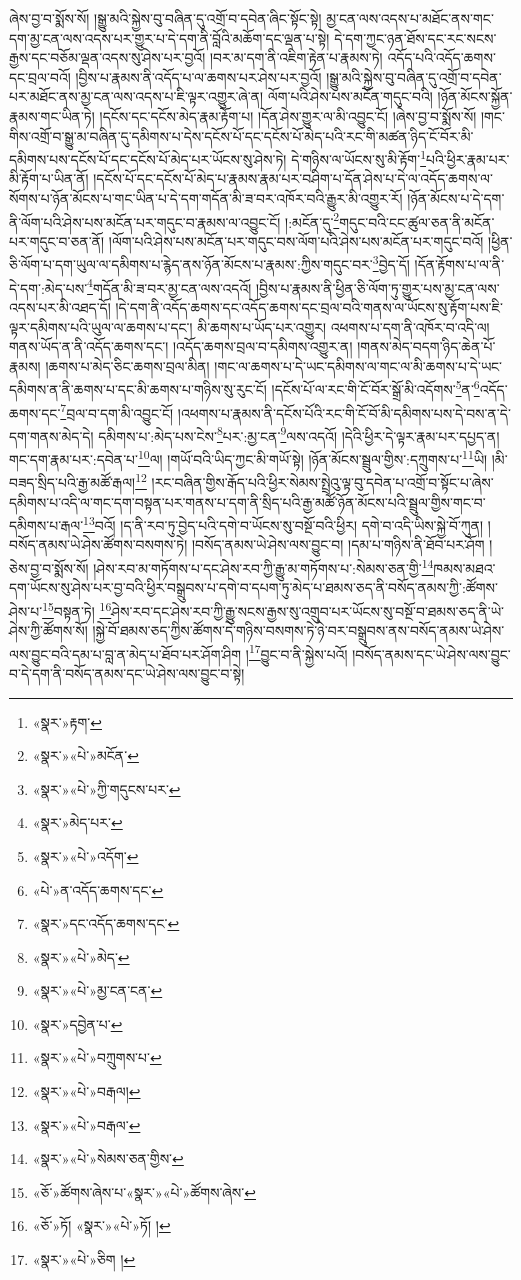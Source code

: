 ཞེས་བྱ་བ་སྨོས་སོ། །སྒྱུ་མའི་སྐྱེས་བུ་བཞིན་དུ་འགྲོ་བ་དབེན་ཞིང་སྟོང་སྟེ། མྱ་ངན་ལས་འདས་པ་མཐོང་ནས་གང་དག་མྱ་ངན་ལས་འདས་པར་གྱུར་པ་དེ་དག་ནི་བློའི་མཆོག་དང་ལྡན་པ་སྟེ། དེ་དག་ཀྱང་ཉན་ཐོས་དང་རང་སངས་རྒྱས་དང་བཅོམ་ལྡན་འདས་སུ་ཤེས་པར་བྱའོ། །བར་མ་དག་ནི་འཇིག་རྟེན་པ་རྣམས་ཏེ། འདོད་པའི་འདོད་ཆགས་དང་བྲལ་བའོ། །བྱིས་པ་རྣམས་ནི་འདོད་པ་ལ་ཆགས་པར་ཤེས་པར་བྱའོ། །སྒྱུ་མའི་སྐྱེས་བུ་བཞིན་དུ་འགྲོ་བ་དབེན་པར་མཐོང་ནས་མྱ་ངན་ལས་འདས་པ་ཇི་ལྟར་འགྱུར་ཞེ་ན། ལོག་པའི་ཤེས་པས་མངོན་གདུང་བའི། །ཉོན་མོངས་སྐྱོན་རྣམས་གང་ཡིན་ཏེ། །དངོས་དང་དངོས་མེད་རྣམ་རྟོག་པ། །དོན་ཤེས་གྱུར་ལ་མི་འབྱུང་ངོ། །ཞེས་བྱ་བ་སྨོས་སོ། །གང་གིས་འགྲོ་བ་སྒྱུ་མ་བཞིན་དུ་དམིགས་པ་དེས་དངོས་པོ་དང་དངོས་པོ་མེད་པའི་རང་གི་མཚན་ཉིད་ངོ་བོར་མི་དམིགས་པས་དངོས་པོ་དང་དངོས་པོ་མེད་པར་ཡོངས་སུ་ཤེས་ཏེ། དེ་གཉིས་ལ་ཡོངས་སུ་མི་རྟོག་\footnote{«སྣར་»རྟག་}པའི་ཕྱིར་རྣམ་པར་མི་རྟོག་པ་ཡིན་ནོ། །དངོས་པོ་དང་དངོས་པོ་མེད་པ་རྣམས་རྣམ་པར་བཤིག་པ་དོན་ཤེས་པ་དེ་ལ་འདོད་ཆགས་ལ་སོགས་པ་ཉོན་མོངས་པ་གང་ཡིན་པ་དེ་དག་གདོན་མི་ཟ་བར་འཁོར་བའི་རྒྱུར་མི་འགྱུར་རོ། །ཉོན་མོངས་པ་དེ་དག་ནི་ལོག་པའི་ཤེས་པས་མངོན་པར་གདུང་བ་རྣམས་ལ་འབྱུང་ངོ། །:མངོན་དུ་\footnote{«སྣར་»«པེ་»མངོན་}གདུང་བའི་ངང་ཚུལ་ཅན་ནི་མངོན་པར་གདུང་བ་ཅན་ནོ། །ལོག་པའི་ཤེས་པས་མངོན་པར་གདུང་བས་ལོག་པའི་ཤེས་པས་མངོན་པར་གདུང་བའོ། །ཕྱིན་ཅི་ལོག་པ་དག་ཡུལ་ལ་དམིགས་པ་རྙེད་ནས་ཉོན་མོངས་པ་རྣམས་:ཀྱིས་གདུང་བར་\footnote{«སྣར་»«པེ་»ཀྱི་གདུངས་པར་}བྱེད་དོ། །དོན་རྟོགས་པ་ལ་ནི་དེ་དག་:མེད་པས་\footnote{«སྣར་»མེད་པར་}གདོན་མི་ཟ་བར་མྱ་ངན་ལས་འདའོ། །བྱིས་པ་རྣམས་ནི་ཕྱིན་ཅི་ལོག་ཏུ་གྱུར་པས་མྱ་ངན་ལས་འདས་པར་མི་འཐད་དོ། །དེ་དག་ནི་འདོད་ཆགས་དང་འདོད་ཆགས་དང་བྲལ་བའི་གནས་ལ་ཡོངས་སུ་རྟོག་པས་ཇི་ལྟར་དམིགས་པའི་ཡུལ་ལ་ཆགས་པ་དང་། མི་ཆགས་པ་ཡོད་པར་འགྱུར། འཕགས་པ་དག་ནི་འཁོར་བ་འདི་ལ། གནས་ཡོད་ན་ནི་འདོད་ཆགས་དང་། །འདོད་ཆགས་བྲལ་བ་དམིགས་འགྱུར་ན། །གནས་མེད་བདག་ཉིད་ཆེན་པོ་རྣམས། །ཆགས་པ་མེད་ཅིང་ཆགས་བྲལ་མིན། །གང་ལ་ཆགས་པ་དེ་ཡང་དམིགས་ལ་གང་ལ་མི་ཆགས་པ་དེ་ཡང་དམིགས་ན་ནི་ཆགས་པ་དང་མི་ཆགས་པ་གཉིས་སུ་རུང་ངོ། །དངོས་པོ་ལ་རང་གི་ངོ་བོར་སྒྲོ་མི་འདོགས་\footnote{«སྣར་»«པེ་»འདོག་}ན་\footnote{«པེ་»ན་འདོད་ཆགས་དང་}འདོད་ཆགས་དང་\footnote{«སྣར་»དང་འདོད་ཆགས་དང་}བྲལ་བ་དག་མི་འབྱུང་ངོ། །འཕགས་པ་རྣམས་ནི་དངོས་པོའི་རང་གི་ངོ་བོ་མི་དམིགས་པས་དེ་བས་ན་དེ་དག་གནས་མེད་དེ། དམིགས་པ་:མེད་པས་ངེས་\footnote{«སྣར་»«པེ་»མེད་}པར་:མྱ་ངན་\footnote{«སྣར་»«པེ་»མྱ་ངན་ངན་}ལས་འདའོ། །དེའི་ཕྱིར་དེ་ལྟར་རྣམ་པར་དཔྱད་ན། གང་དག་རྣམ་པར་:དབེན་པ་\footnote{«སྣར་»དབྱེན་པ་}ལ། །གཡོ་བའི་ཡིད་ཀྱང་མི་གཡོ་སྟེ། །ཉོན་མོངས་སྦྲུལ་གྱིས་:དཀྲུགས་པ་\footnote{«སྣར་»«པེ་»བཀྲུགས་པ་}ཡི། །མི་བཟད་སྲིད་པའི་རྒྱ་མཚོ་རྒལ།\footnote{«སྣར་»«པེ་»བརྒལ།} །རང་བཞིན་གྱིས་རྒོད་པའི་ཕྱིར་སེམས་སྤྲེའུ་ལྟ་བུ་དབེན་པ་འགྲོ་བ་སྟོང་པ་ཞེས་དམིགས་པ་འདི་ལ་གང་དག་བསྟན་པར་གནས་པ་དག་ནི་སྲིད་པའི་རྒྱ་མཚོ་ཉོན་མོངས་པའི་སྦྲུལ་གྱིས་གང་བ་དམིགས་པ་རྒལ་\footnote{«སྣར་»«པེ་»བརྒལ་}བའོ། །ད་ནི་རབ་ཏུ་བྱེད་པའི་དགེ་བ་ཡོངས་སུ་བསྔོ་བའི་ཕྱིར། དགེ་བ་འདི་ཡིས་སྐྱེ་བོ་ཀུན། །བསོད་ནམས་ཡེ་ཤེས་ཚོགས་བསགས་ཏེ། །བསོད་ནམས་ཡེ་ཤེས་ལས་བྱུང་བ། །དམ་པ་གཉིས་ནི་ཐོབ་པར་ཤོག །ཅེས་བྱ་བ་སྨོས་སོ། །ཤེས་རབ་མ་གཏོགས་པ་དང་ཤེས་རབ་ཀྱི་རྒྱུ་མ་གཏོགས་པ་:སེམས་ཅན་གྱི་\footnote{«སྣར་»«པེ་»སེམས་ཅན་གྱིས་}ཁམས་མཐའ་དག་ཡོངས་སུ་ཤེས་པར་བྱ་བའི་ཕྱིར་བསྒྲུབས་པ་དགེ་བ་དཔག་ཏུ་མེད་པ་ཐམས་ཅད་ནི་བསོད་ནམས་ཀྱི་:ཚོགས་ཤེས་པ་\footnote{«ཅོ་»ཚོགས་ཞེས་པ་«སྣར་»«པེ་»ཚོགས་ཞེས་}བསྟན་ཏེ། \footnote{«ཅོ་»ཏོ། «སྣར་»«པེ་»ཏོ། ། }ཤེས་རབ་དང་ཤེས་རབ་ཀྱི་རྒྱུ་སངས་རྒྱས་སུ་འགྲུབ་པར་ཡོངས་སུ་བསྔོ་བ་ཐམས་ཅད་ནི་ཡེ་ཤེས་ཀྱི་ཚོགས་སོ། །སྐྱེ་བོ་ཐམས་ཅད་ཀྱིས་ཚོགས་དེ་གཉིས་བསགས་ཏེ་ཉེ་བར་བསྒྲུབས་ནས་བསོད་ནམས་ཡེ་ཤེས་ལས་བྱུང་བའི་དམ་པ་བླ་ན་མེད་པ་ཐོབ་པར་ཤོག་ཤིག །\footnote{«སྣར་»«པེ་»ཅིག །}བྱུང་བ་ནི་སྐྱེས་པའོ། །བསོད་ནམས་དང་ཡེ་ཤེས་ལས་བྱུང་བ་དེ་དག་ནི་བསོད་ནམས་དང་ཡེ་ཤེས་ལས་བྱུང་བ་སྟེ། 